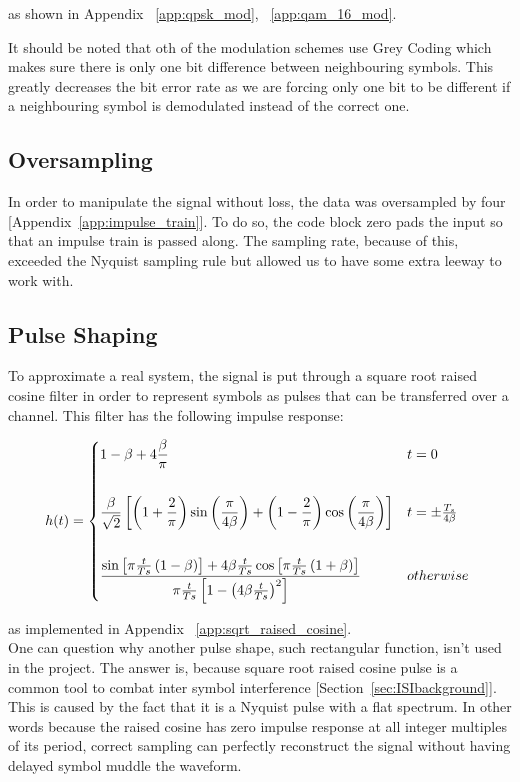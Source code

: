 \documentclass[]{article}
\begin{document}
as shown in Appendix ~\ref{app:qpsk_mod}, ~\ref{app:qam_16_mod}.

It should be noted that oth of the modulation schemes use Grey Coding which makes sure there is only one bit difference between neighbouring symbols. This greatly decreases the bit error rate as we are forcing only one bit to be different if a neighbouring symbol is demodulated instead of the correct one. 

\subsection{Oversampling}
\label{sec:oversample}
In order to manipulate the signal without loss, the data was oversampled by four [Appendix~\ref{app:impulse_train}].  To do so, the code block zero pads the input so that an impulse train is passed along.  The sampling rate, because of this, exceeded the Nyquist sampling rule but allowed us to have some extra leeway to work with.   

\subsection{Pulse Shaping}
\label{sec:srrc}
To approximate a real system, the signal is put through a square root raised cosine filter in order to represent symbols as pulses that can be transferred over a channel. This filter has the following impulse response:

 \[
 h(t) = \begin{dcases*}
        1-\beta+4\frac{\beta}{\pi} &  $t = 0$\\ \\        
        \frac{\beta}{\sqrt{2}}\left[\left(1+\frac{2}{\pi}\right)\sin\left(\frac{\pi}{4\beta}\right)+\left(1-\frac{2}{\pi}\right)\cos\left(\frac{\pi}{4\beta}\right)\right] & $t=\pm \frac{T_s}{4\beta}$ \\ \\
        \frac{\sin\left[\pi\frac{t}{Ts}\left(1-\beta\right)\right]+4\beta\frac{t}{Ts}\cos\left[\pi\frac{t}{Ts}\left(1+\beta\right)\right]}{\pi\frac{t}{Ts}\left[1-\left(4\beta\frac{t}{Ts}\right)^2\right]} & $otherwise$ \\
        \end{dcases*}
\]

as implemented in Appendix ~\ref{app:sqrt_raised_cosine}.  \\

One can question why another pulse shape, such rectangular function, isn't used in the project. The answer is, because square root raised cosine pulse is a common tool to combat inter symbol interference [Section~\ref{sec:ISIbackground}].  This is caused by the fact that it is a Nyquist pulse with a flat spectrum. In other words because the raised cosine has zero impulse response at all integer multiples of its period, correct sampling can perfectly reconstruct the signal without having delayed symbol muddle the waveform. 
\end{document}
